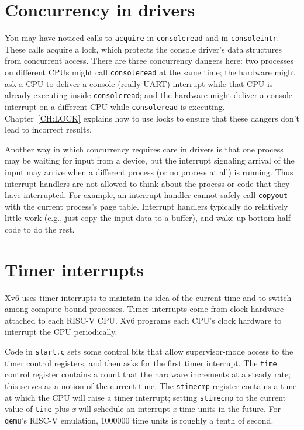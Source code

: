 \section{Concurrency in drivers}

You may have noticed calls to {\tt acquire} in {\tt consoleread}
and in {\tt consoleintr}. These calls acquire a lock, which protects
the console driver's data structures from concurrent access.
There are three concurrency dangers here: two processes on
different CPUs might call {\tt consoleread} at the same time;
the hardware might ask a CPU to deliver a console (really 
UART) interrupt while that CPU is already executing inside
{\tt consoleread};
and the hardware might deliver a console interrupt on
a different CPU while {\tt consoleread} is executing.
Chapter~\ref{CH:LOCK} explains how to use locks
to ensure that these dangers don't lead to incorrect results.

Another way in which concurrency requires care in drivers is that one
process may be waiting for input from a device, but the interrupt
signaling arrival of the input may arrive when a different process (or
no process at all) is running. Thus interrupt handlers are not allowed
to think about the process or code that they have interrupted. For
example, an interrupt handler cannot safely call {\tt copyout} with
the current process's page table. Interrupt handlers typically do
relatively little work (e.g., just copy the input data to a buffer),
and wake up bottom-half code to do the rest.

\section{Timer interrupts}

Xv6 uses timer interrupts to maintain its idea of the
current time and to switch among compute-bound processes. Timer
interrupts come from clock hardware attached to each RISC-V CPU. Xv6
programs each CPU's clock hardware to interrupt the CPU periodically.

Code in {\tt start.c} 
 sets some control bits
that allow supervisor-mode access to the timer control
registers, and then asks for the first timer interrupt.
The {\tt time} control register contains a count that the
hardware increments at a steady rate; this serves as a
notion of the current time. The {\tt stimecmp} register
contains a time at which the CPU will raise a timer
interrupt; setting {\tt stimecmp} to the current value
of {\tt time} plus {\it x} will schedule an interrupt
{\it x} time units in the future. For {\tt qemu}'s RISC-V
emulation, 1000000 time units is roughly a tenth of second.

